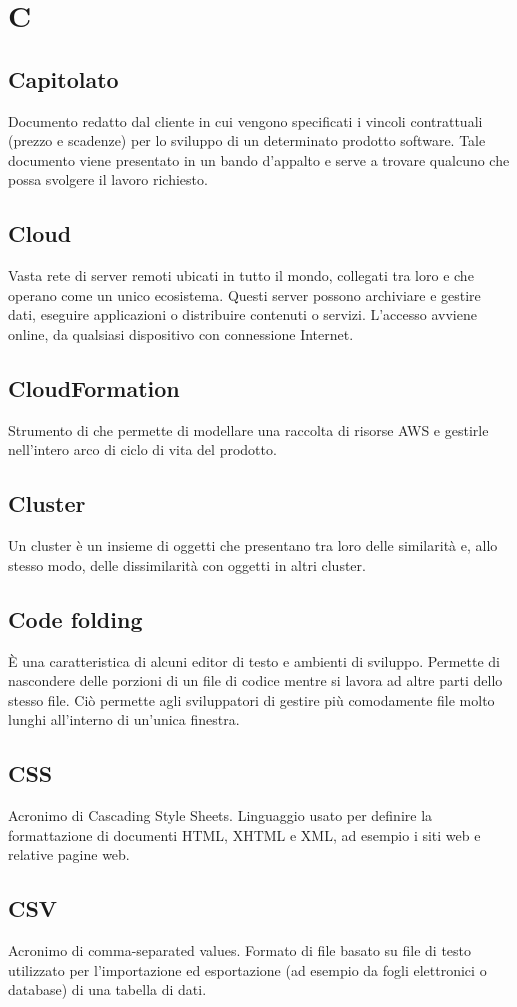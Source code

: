 \section*{C}
\markright{}

\subsection*{Capitolato}
Documento redatto dal cliente in cui vengono specificati i vincoli contrattuali (prezzo e scadenze) per lo sviluppo di un determinato prodotto software. Tale documento viene presentato in un bando d’appalto e serve a trovare qualcuno che possa svolgere il lavoro richiesto.

\subsection*{Cloud}
Vasta rete di server remoti ubicati in tutto il mondo, collegati tra loro e che operano come un unico ecosistema. Questi server possono archiviare e gestire dati, eseguire applicazioni o distribuire contenuti o servizi. L'accesso avviene online, da qualsiasi dispositivo con connessione Internet.

\subsection*{CloudFormation}
Strumento di  che permette di modellare una raccolta di risorse AWS e gestirle nell'intero arco di ciclo di vita del prodotto.

\subsection*{Cluster}
Un cluster è un insieme di oggetti che presentano tra loro delle similarità e, allo stesso modo, delle dissimilarità con oggetti in altri cluster.

\subsection*{Code folding}
È una caratteristica di alcuni editor di testo e ambienti di sviluppo. Permette di nascondere delle porzioni di un file di codice mentre si lavora ad altre parti dello stesso file. Ciò permette agli sviluppatori di gestire più comodamente file molto lunghi all'interno di un'unica finestra.

\subsection*{CSS}
Acronimo di Cascading Style Sheets. Linguaggio usato per definire la formattazione di documenti HTML, XHTML e XML, ad esempio i siti web e relative pagine web.

\subsection*{CSV}
Acronimo di comma-separated values. Formato di file basato su file di testo utilizzato per l'importazione ed esportazione (ad esempio da fogli elettronici o database) di una tabella di dati. 
